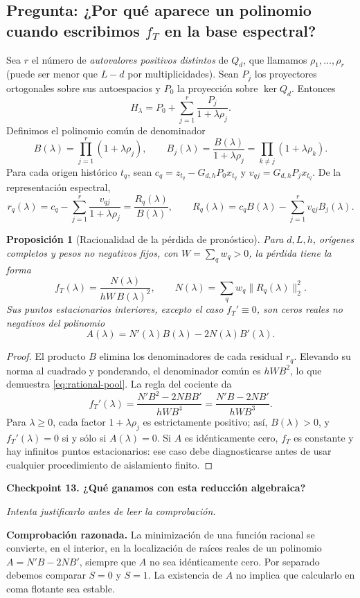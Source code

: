 \documentclass[11pt,letterpaper,parskip=half,headings=small]{scrartcl}
\newtheorem{proposicion}{Proposición}[section]
\theoremstyle{definition}\newtheorem{definicion}[proposicion]{Definición}
\theoremstyle{remark}\newtheorem{observacion}[proposicion]{Observación}
\newcommand{\pregunta}[1]{\subsection{Pregunta: #1}}
\newcommand{\checkpoint}[3]{%
  \par\medskip\noindent\textbf{\color{blue!45!black}Checkpoint #1. #2}\par
  \noindent\emph{Intenta justificarlo antes de leer la comprobación.}\par
  \noindent\textbf{Comprobación razonada. }#3\par\bigskip
}
\begin{document}
\pregunta{¿Por qué aparece un polinomio cuando escribimos $f_T$ en la base espectral?}
Sea $r$ el número de \emph{autovalores positivos distintos} de $Q_d$,
que llamamos $\rho_1,\ldots,\rho_r$ (puede ser menor que $L-d$ por
multiplicidades). Sean $P_j$ los proyectores ortogonales sobre sus
autoespacios y $P_0$ la proyección sobre $\ker Q_d$. Entonces
\[
H_\lambda=P_0+\sum_{j=1}^r\frac{P_j}{1+\lambda\rho_j}.
\]
Definimos el polinomio común de denominador
\[
B(\lambda)=\prod_{j=1}^r(1+\lambda\rho_j),\qquad
B_j(\lambda)=\frac{B(\lambda)}{1+\lambda\rho_j}
=\prod_{k\ne j}(1+\lambda\rho_k).
\]
Para cada origen histórico $t_q$, sean $c_q=z_{t_q}-G_{d,h}P_0x_{t_q}$
y $v_{qj}=G_{d,h}P_jx_{t_q}$. De la representación espectral,
\[
r_q(\lambda)=c_q-\sum_{j=1}^r\frac{v_{qj}}{1+\lambda\rho_j}
=\frac{R_q(\lambda)}{B(\lambda)},\qquad
R_q(\lambda)=c_qB(\lambda)-\sum_{j=1}^rv_{qj}B_j(\lambda).
\]
\begin{proposicion}[Racionalidad de la pérdida de pronóstico]\label{prop:rational}
Para $d,L,h$, orígenes completos y pesos no negativos fijos, con
$W=\sum_qw_q>0$, la pérdida tiene la forma
\begin{equation}\label{eq:rational-pool}
\boxed{f_T(\lambda)=\frac{N(\lambda)}{hW\,B(\lambda)^2},\qquad
N(\lambda)=\sum_qw_q\|R_q(\lambda)\|_2^2.}
\end{equation}
Sus puntos estacionarios interiores, excepto el caso $f_T'\equiv0$,
son ceros reales no negativos del polinomio
\begin{equation}\label{eq:rootpoly}
\boxed{A(\lambda)=N'(\lambda)B(\lambda)-2N(\lambda)B'(\lambda).}
\end{equation}
\end{proposicion}
\begin{proof}
El producto $B$ elimina los denominadores de cada residual $r_q$.
Elevando su norma al cuadrado y ponderando, el denominador común es
$hWB^2$, lo que demuestra \eqref{eq:rational-pool}. La regla del
cociente da
\[
f_T'(\lambda)=\frac{N'B^2-2NBB'}{hWB^4}
=\frac{N'B-2NB'}{hWB^3}.
\]
Para $\lambda\ge0$, cada factor $1+\lambda\rho_j$ es estrictamente
positivo; así, $B(\lambda)>0$, y $f_T'(\lambda)=0$ si y sólo si
$A(\lambda)=0$. Si $A$ es idénticamente cero, $f_T$ es constante y
hay infinitos puntos estacionarios: ese caso debe diagnosticarse
antes de usar cualquier procedimiento de aislamiento finito.
\end{proof}

\checkpoint{13}{¿Qué ganamos con esta reducción algebraica?}{La minimización de una función racional se convierte, en el interior, en la localización de raíces reales de un polinomio $A=N'B-2NB'$, siempre que $A$ no sea idénticamente cero. Por separado debemos comparar $S=0$ y $S=1$. La existencia de $A$ no implica que calcularlo en coma flotante sea estable.}
\end{document}
